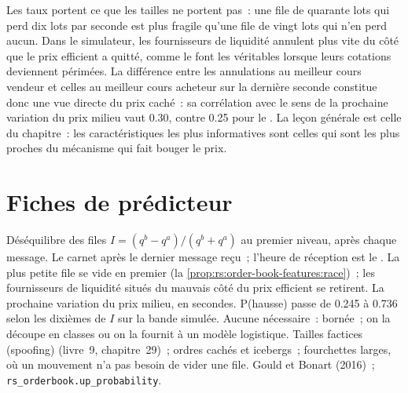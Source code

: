 Les taux portent ce que les tailles ne portent pas~: une file de quarante lots qui perd dix lots par seconde est plus fragile qu'une file de vingt lots qui n'en perd aucun. Dans le simulateur,
les fournisseurs de liquidité annulent plus vite du côté que le prix efficient a quitté, comme le font les véritables lorsque leurs cotations deviennent périmées.
La différence entre les annulations au meilleur cours vendeur et celles au meilleur cours acheteur sur la dernière seconde constitue donc une vue directe du prix caché~:
sa corrélation avec le sens de la prochaine variation du prix milieu vaut 0.30, contre 0.25 pour le . La leçon générale est celle du chapitre~:
les caractéristiques les plus informatives sont celles qui sont les plus proches du mécanisme qui fait bouger le prix.

\section{Fiches de prédicteur}

\begin{predictorcard}{Déséquilibre des files}\label{pred:rs:order-book-features:imbalance}
 $I = (q^b - q^a)/(q^b + q^a)$ au premier niveau, après chaque message.
 Le carnet après le dernier message reçu~; l'heure de réception est le .
 La plus petite file se vide en premier (la \cref{prop:rs:order-book-features:race})~; les fournisseurs de liquidité situés du mauvais côté du
prix efficient se retirent.
 La prochaine variation du prix milieu, en secondes. P(hausse) passe de 0.245 à 0.736 selon les dixièmes de $I$ sur la bande simulée.
 Aucune nécessaire~: bornée~; on la découpe en classes ou on la fournit à un modèle logistique.
 Tailles factices (spoofing) (livre~9, chapitre~29)~; ordres cachés et icebergs~; fourchettes larges, où un mouvement n'a pas besoin de vider une file.
 Gould et Bonart (2016)~; \texttt{rs\_orderbook.up\_probability}.
\end{predictorcard}

